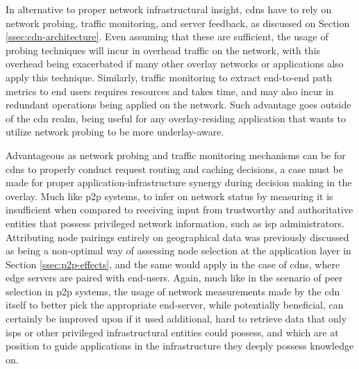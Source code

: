     In alternative to proper network infrastructural insight, \glspl{cdn} have to rely on network probing, traffic monitoring, and server feedback, as discussed on Section \ref{ssec:cdn-architecture}.
    Even assuming that these are sufficient, the usage of probing techniques will incur in overhead traffic on the network, with this overhead being exacerbated if many other overlay networks or applications also apply this technique.
    Similarly, traffic monitoring to extract end-to-end path metrics to end users requires resources and takes time, and may also incur in redundant operations being applied on the network.
Such advantage goes outside of the \gls{cdn} realm, being useful for any overlay-residing application that wants to utilize network probing to be more underlay-aware.

    Advantageous as network probing and traffic monitoring mechanisms can be for \glspl{cdn} to properly conduct request routing and caching decisions, a case must be made for proper application-infrastructure synergy during decision making in the overlay.
    Much like \gls{p2p} systems, to infer on network status by measuring it is insufficient when compared to receiving input from trustworthy and authoritative entities that possess privileged network information, such as \gls{isp} administrators.
    Attributing node pairings entirely on geographical data was previously discussed as being a non-optimal way of assessing node selection at the application layer in Section \ref{ssec:p2p-effects}, and the same would apply in the case of \glspl{cdn}, where edge servers are paired with end-users.
    Again, much like in the scenario of peer selection in \gls{p2p} systems, the usage of network measurements made by the \gls{cdn} itself to better pick the appropriate end-server, while potentially beneficial, can certainly be improved upon if it used additional, hard to retrieve data that only \glspl{isp} or other privileged infrastructural entities could possess, and which are at position to guide applications in the infrastructure they deeply possess knowledge on.

